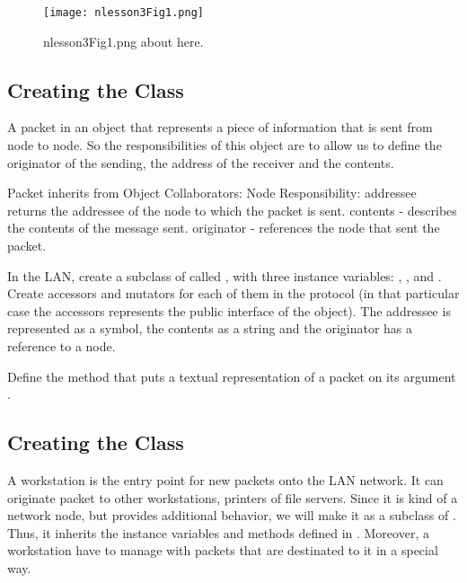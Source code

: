 \begin{figure}[htbp]
\begin{center}
\texttt{[image: nlesson3Fig1.png]}
\caption{nlesson3Fig1.png about here.}
\end{center}
\end{figure}



\subsection*{Creating the Class }

A packet in an object that represents a piece of information that is sent from node to node. So the responsibilities of this object are to allow us to define the originator of the sending, the address of the receiver and the contents.

\begin{code}
Packet inherits from Object
Collaborators: Node
Responsibility:
addressee returns the addressee of the node to which 
the packet is sent.
contents - describes the contents of the message sent.
originator - references the node that sent the packet.
\end{code}

\exercise  In the \category LAN, create a subclass of
 called , with three instance
variables: , , and .
Create accessors and mutators for each of them in the
 protocol (in that particular case the accessors
represents the public interface of the object). The addressee is
represented as a symbol, the contents as a string and the
originator has a reference to a node.

\exercise  Define the method  that puts a
textual representation of a packet on its argument
.

\subsection*{Creating the Class }

A workstation is the entry point for new packets onto the LAN
network. It can originate packet to other workstations, printers
of file servers. Since it is kind of a network node, but provides
additional behavior, we will make it as a subclass of
. Thus, it inherits the instance variables and
methods defined in . Moreover, a workstation have to
manage with packets that are destinated to it in a special way.


